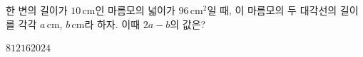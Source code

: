 한 변의 길이가 $10\,\mathrm{cm}$인 마름모의 넓이가 $96\,\mathrm{cm}^2$일 때, 이 마름모의 두 대각선의 길이를 각각 $a\,\mathrm{cm}$, $b\,\mathrm{cm}$라 하자. 이때 $2a-b$의 값은? 
\begin{choices32}{$8$}{$12$}{$16$}{$20$}{$24$}\end{choices32}
